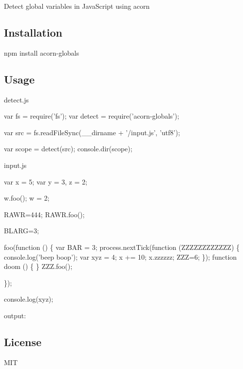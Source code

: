 Detect global variables in Java\+Script using acorn

\href{https://travis-ci.org/ForbesLindesay/acorn-globals}{\tt } \href{https://david-dm.org/ForbesLindesay/acorn-globals}{\tt } \href{https://www.npmjs.org/package/acorn-globals}{\tt }

\subsection*{Installation}

\begin{DoxyVerb}npm install acorn-globals
\end{DoxyVerb}


\subsection*{Usage}

detect.\+js


\begin{DoxyCode}
var fs = require('fs');
var detect = require('acorn-globals');

var src = fs.readFileSync(\_\_dirname + '/input.js', 'utf8');

var scope = detect(src);
console.dir(scope);
\end{DoxyCode}


input.\+js


\begin{DoxyCode}
var x = 5;
var y = 3, z = 2;

w.foo();
w = 2;

RAWR=444;
RAWR.foo();

BLARG=3;

foo(function () \{
    var BAR = 3;
    process.nextTick(function (ZZZZZZZZZZZZ) \{
        console.log('beep boop');
        var xyz = 4;
        x += 10;
        x.zzzzzz;
        ZZZ=6;
    \});
    function doom () \{
    \}
    ZZZ.foo();

\});

console.log(xyz);
\end{DoxyCode}


output\+:




\subsection*{License}

M\+IT 